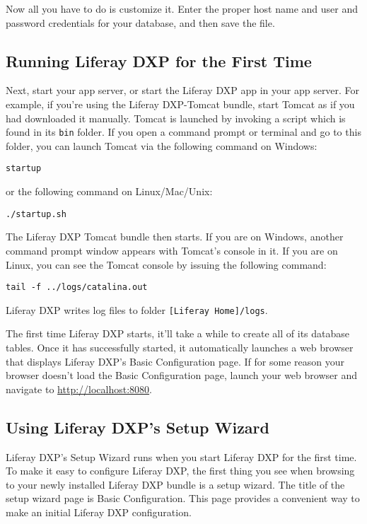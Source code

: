 Now all you have to do is customize it. Enter the proper host name and
user and password credentials for your database, and then save the file.

\subsection{Running Liferay DXP for the First
Time}\label{running-liferay-dxp-for-the-first-time}

Next, start your app server, or start the Liferay DXP app in your app
server. For example, if you're using the Liferay DXP-Tomcat bundle,
start Tomcat as if you had downloaded it manually. Tomcat is launched by
invoking a script which is found in its \texttt{bin} folder. If you open
a command prompt or terminal and go to this folder, you can launch
Tomcat via the following command on Windows:

\begin{verbatim}
startup
\end{verbatim}

or the following command on Linux/Mac/Unix:

\begin{verbatim}
./startup.sh
\end{verbatim}

The Liferay DXP Tomcat bundle then starts. If you are on Windows,
another command prompt window appears with Tomcat's console in it. If
you are on Linux, you can see the Tomcat console by issuing the
following command:

\begin{verbatim}
tail -f ../logs/catalina.out
\end{verbatim}

Liferay DXP writes log files to folder
\texttt{{[}Liferay\ Home{]}/logs}.

The first time Liferay DXP starts, it'll take a while to create all of
its database tables. Once it has successfully started, it automatically
launches a web browser that displays Liferay DXP's Basic Configuration
page. If for some reason your browser doesn't load the Basic
Configuration page, launch your web browser and navigate to
\url{http://localhost:8080}.

\subsection{Using Liferay DXP's Setup
Wizard}\label{using-liferay-dxps-setup-wizard}

Liferay DXP's Setup Wizard runs when you start Liferay DXP for the first
time. To make it easy to configure Liferay DXP, the first thing you see
when browsing to your newly installed Liferay DXP bundle is a setup
wizard. The title of the setup wizard page is Basic Configuration. This
page provides a convenient way to make an initial Liferay DXP
configuration.

